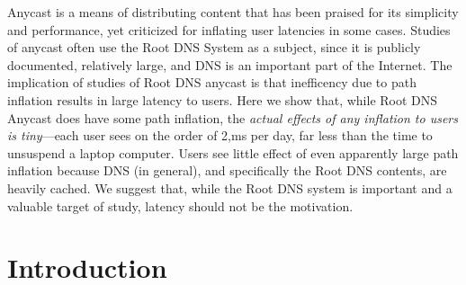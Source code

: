 \documentclass[sigconf,nonacm,10pt]{acmart}
\begin{document}
Anycast is a means of distributing content that has been praised for its
simplicity and performance, yet criticized for inflating user latencies
in some cases. Studies of anycast often use the Root DNS System as a
subject, since it is publicly documented, relatively large, and DNS is
an important part of the Internet. The implication of studies of Root
DNS anycast is that inefficency due to path inflation results in large
latency to users. Here we show that, while Root DNS Anycast does have
some path inflation, the
\emph{actual effects of any inflation to users is tiny}---each user sees
on the order of 2,ms per day, far less than the time to unsuspend a
laptop computer. Users see little effect of even apparently large path
inflation because DNS (in general), and specifically the Root DNS
contents, are heavily cached. We suggest that, while the Root DNS system
is important and a valuable target of study, latency should not be the
motivation.

\section{Introduction}\label{introduction-1}
\end{document}
